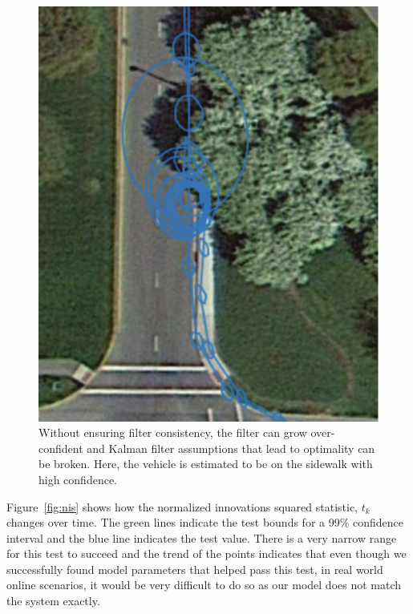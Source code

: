 \begin{figure}
\includegraphics[width=\columnwidth]{airportloop_map_bad}
\caption{Without ensuring filter consistency, the filter can grow over-confident and Kalman filter assumptions that lead to optimality can be broken.  Here, the vehicle is estimated to be on the sidewalk with high confidence.}
\label{fig:airportloop_map_bad}
\end{figure}

Figure~\ref{fig:nis} shows how the normalized innovations squared statistic, $t_k$ changes over time.  The green lines indicate the test bounds for a 99\% confidence interval and the blue line indicates the test value.  There is a very narrow range for this test to succeed and the trend of the points indicates that even though we successfully found model parameters that helped pass this test, in real world online scenarios, it would be very difficult to do so as our model does not match the system exactly.


